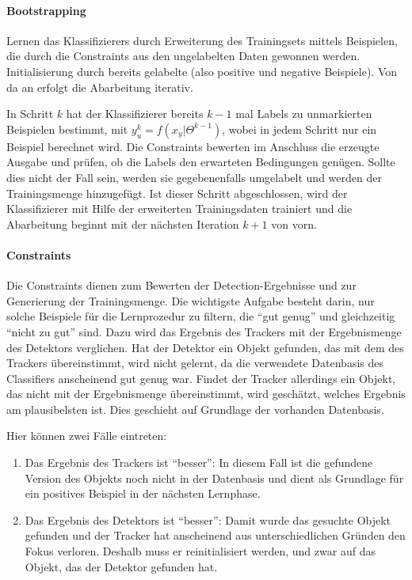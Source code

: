 	\paragraph{Bootstrapping}
	Lernen das Klassifizierers durch Erweiterung des Trainingsets mittels Beispielen, die durch die Constraints aus den ungelabelten Daten gewonnen werden. Initialisierung durch bereits gelabelte (also positive und negative Beispiele). Von da an erfolgt die Abarbeitung iterativ.

	In Schritt $k$ hat der Klassifizierer bereits $k-1$ mal Labels zu unmarkierten Beispielen bestimmt, mit $y_{u}^{k}=f(x_{y}|\Theta^{k-1})$, wobei in jedem Schritt nur ein Beispiel berechnet wird. Die Constraints bewerten im Anschluss die erzeugte Ausgabe und prüfen, ob die Labels den erwarteten Bedingungen genügen. Sollte dies nicht der Fall sein, werden sie gegebenenfalls umgelabelt und werden der Trainingsmenge hinzugefügt. Ist dieser Schritt abgeschlossen, wird der Klassifizierer mit Hilfe der erweiterten Trainingsdaten trainiert und die Abarbeitung beginnt mit der nächsten Iteration $k+1$ von vorn.

	\paragraph{Constraints}
	Die Constraints dienen zum Bewerten der Detection-Ergebnisse und zur Generierung der Trainingsmenge. Die wichtigste Aufgabe besteht darin, nur solche Beispiele für die Lernprozedur zu filtern, die ``gut genug'' und gleichzeitig ``nicht zu gut'' sind. Dazu wird das Ergebnis des Trackers mit der Ergebnismenge des Detektors verglichen. Hat der Detektor ein Objekt gefunden, das mit dem des Trackers übereinstimmt, wird nicht gelernt, da die verwendete Datenbasis des Classifiers anscheinend gut genug war. Findet der Tracker allerdings ein Objekt, das nicht mit der Ergebnismenge übereinstimmt, wird geschätzt, welches Ergebnis am plausibelsten ist. Dies geschieht auf Grundlage der vorhanden Datenbasis.

	Hier können zwei Fälle eintreten:
	\begin{enumerate}
	\item Das Ergebnis des Trackers ist ``besser'': In diesem Fall ist die gefundene Version des Objekts noch nicht in der Datenbasis und dient als Grundlage für ein positives Beispiel in der nächsten Lernphase.
	\item Das Ergebnis des Detektors ist ``besser'': Damit wurde das gesuchte Objekt gefunden und der Tracker hat anscheinend aus unterschiedlichen Gründen den Fokus verloren. Deshalb muss er reinitialisiert werden, und zwar auf das Objekt, das der Detektor gefunden hat.
	\end{enumerate}

